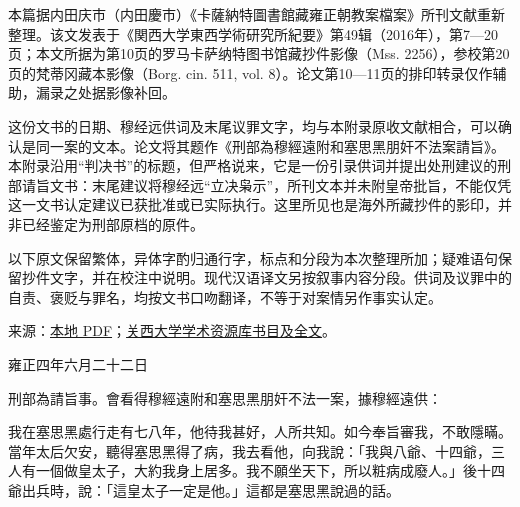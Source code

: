 \clearpage\label{replacement-start}\begingroup
\normalsize{}
本篇据内田庆市（内田慶市）《卡薩納特圖書館藏雍正朝教案檔案》所刊文献重新整理。该文发表于《関西大学東西学術研究所紀要》第49辑（2016年），第7—20页；本文所据为第10页的罗马卡萨纳特图书馆藏抄件影像（Mss. 2256），参校第20页的梵蒂冈藏本影像（Borg. cin. 511, vol. 8）。论文第10—11页的排印转录仅作辅助，漏录之处据影像补回。\par
这份文书的日期、穆经远供词及末尾议罪文字，均与本附录原收文献相合，可以确认是同一案的文本。论文将其题作《刑部為穆經遠附和塞思黑朋奸不法案請旨》。本附录沿用“判决书”的标题，但严格说来，它是一份{\bookhei 引录供词并提出处刑建议的刑部请旨文书}：末尾建议将穆经远“立决枭示”，所刊文本并未附皇帝批旨，不能仅凭这一文书认定建议已获批准或已实际执行。这里所见也是海外所藏抄件的影印，并非已经鉴定为刑部原档的原件。\par
以下原文保留繁体，异体字酌归通行字，标点和分段为本次整理所加；疑难语句保留抄件文字，并在校注中说明。现代汉语译文另按叙事内容分段。供词及议罪中的自责、褒贬与罪名，均按文书口吻翻译，不等于对案情另作事实认定。\par
来源：\href{assets/sources/KU-0400-20160401-02-1.pdf}{本地 PDF}；\href{https://kansai-u.repo.nii.ac.jp/records/1998}{关西大学学术资源库书目及全文}。\par
\begingroup\bookkai
雍正四年六月二十二日\par
刑部為請旨事。會看得穆經遠附和塞思黑朋奸不法一案，據穆經遠供：\par
我在塞思黑處行走有七八年，他待我甚好，人所共知。如今奉旨審我，不敢隱瞞。當年太后欠安，聽得塞思黑得了病，我去看他，向我說：「我與八爺、十四爺，三人有一個做皇太子，大約我身上居多。我不願坐天下，所以粧病成廢人。」後十四爺出兵時，說：「這皇太子一定是他。」這都是塞思黑說過的話。\par
